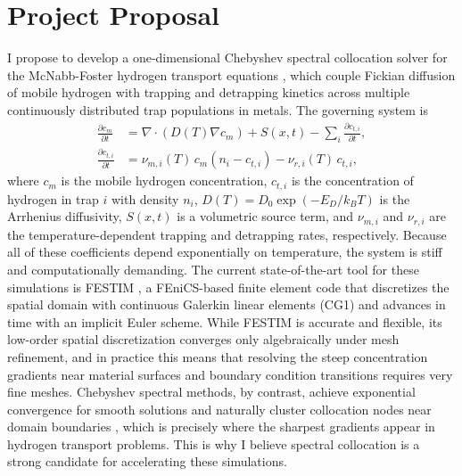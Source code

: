 \section{Project Proposal}

I propose to develop a one-dimensional Chebyshev spectral collocation solver for the McNabb-Foster hydrogen transport equations \cite{mcnabb1963}, which couple Fickian diffusion of mobile hydrogen with trapping and detrapping kinetics across multiple continuously distributed trap populations in metals. The governing system is
\begin{align}
\frac{\partial c_m}{\partial t} &= \nabla \cdot \left( D(T) \nabla c_m \right) + S(x,t) - \sum_i \frac{\partial c_{t,i}}{\partial t}, \label{eq:mobile} \\
\frac{\partial c_{t,i}}{\partial t} &= \nu_{m,i}(T) \, c_m \left( n_i - c_{t,i} \right) - \nu_{r,i}(T) \, c_{t,i}, \label{eq:trapped}
\end{align}
where $c_m$ is the mobile hydrogen concentration, $c_{t,i}$ is the concentration of hydrogen in trap $i$ with density $n_i$, $D(T) = D_0 \exp(-E_D / k_B T)$ is the Arrhenius diffusivity, $S(x,t)$ is a volumetric source term, and $\nu_{m,i}$ and $\nu_{r,i}$ are the temperature-dependent trapping and detrapping rates, respectively. Because all of these coefficients depend exponentially on temperature, the system is stiff and computationally demanding. The current state-of-the-art tool for these simulations is FESTIM \cite{delaporte2024}, a FEniCS-based finite element code that discretizes the spatial domain with continuous Galerkin linear elements (CG1) and advances in time with an implicit Euler scheme. While FESTIM is accurate and flexible, its low-order spatial discretization converges only algebraically under mesh refinement, and in practice this means that resolving the steep concentration gradients near material surfaces and boundary condition transitions requires very fine meshes. Chebyshev spectral methods, by contrast, achieve exponential convergence for smooth solutions and naturally cluster collocation nodes near domain boundaries \cite{boyd2001}, which is precisely where the sharpest gradients appear in hydrogen transport problems. This is why I believe spectral collocation is a strong candidate for accelerating these simulations.

